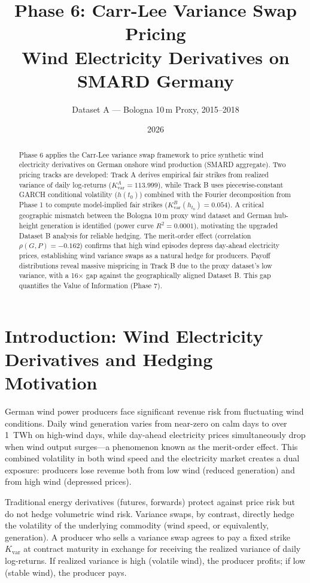 \documentclass[11pt, a4paper, twoside]{article}
\title{\textbf{Phase 6: Carr-Lee Variance Swap Pricing \\ Wind Electricity Derivatives on SMARD Germany}}
\author{Dataset A --- Bologna 10\,m Proxy, 2015--2018}
\date{2026}
\begin{document}
\maketitle

\begin{abstract}
Phase 6 applies the Carr-Lee variance swap framework to price synthetic wind electricity derivatives on German onshore wind production (SMARD aggregate). Two pricing tracks are developed: Track A derives empirical fair strikes from realized variance of daily log-returns ($K_{\text{var}}^A = 113.999$), while Track B uses piecewise-constant GARCH conditional volatility ($h(t_0)$) combined with the Fourier decomposition from Phase 1 to compute model-implied fair strikes ($K_{\text{var}}^B(h_{t_0}) = 0.054$). A critical geographic mismatch between the Bologna 10\,m proxy wind dataset and German hub-height generation is identified (power curve $R^2 = 0.0001$), motivating the upgraded Dataset B analysis for reliable hedging. The merit-order effect (correlation $\rho(G, P) = -0.162$) confirms that high wind episodes depress day-ahead electricity prices, establishing wind variance swaps as a natural hedge for producers. Payoff distributions reveal massive mispricing in Track B due to the proxy dataset's low variance, with a 16× gap against the geographically aligned Dataset B. This gap quantifies the Value of Information (Phase 7).
\end{abstract}

\section{Introduction: Wind Electricity Derivatives and Hedging Motivation}

German wind power producers face significant revenue risk from fluctuating wind conditions. Daily wind generation varies from near-zero on calm days to over 1~TWh on high-wind days, while day-ahead electricity prices simultaneously drop when wind output surges---a phenomenon known as the merit-order effect. This combined volatility in both wind speed and the electricity market creates a dual exposure: producers lose revenue both from low wind (reduced generation) and from high wind (depressed prices).

Traditional energy derivatives (futures, forwards) protect against price risk but do not hedge volumetric wind risk. Variance swaps, by contrast, directly hedge the volatility of the underlying commodity (wind speed, or equivalently, generation). A producer who sells a variance swap agrees to pay a fixed strike $K_{\text{var}}$ at contract maturity in exchange for receiving the realized variance of daily log-returns. If realized variance is high (volatile wind), the producer profits; if low (stable wind), the producer pays.
\end{document}
